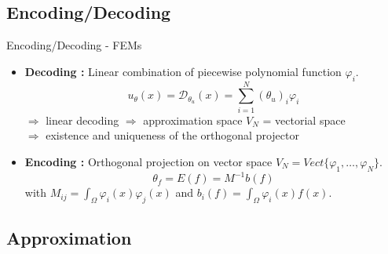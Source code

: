 \subsection{Encoding/Decoding}

\begin{frame}{Encoding/Decoding - FEMs}
	\begin{itemize}[\textbullet]
		\item \textbf{Decoding :} Linear combination of piecewise polynomial function $\varphi_i$.
		\begin{equation*}
			u_\theta(x)=\mathcal{D}_{\theta_u}(x) = \sum_{i=1}^{N}(\theta_u)_i\varphi_i
		\end{equation*}
		$\Rightarrow$ linear decoding $\Rightarrow$ approximation space $V_N$ = vectorial space \\
		$\Rightarrow$ existence and uniqueness of the orthogonal projector
		\item \textbf{Encoding :} Orthogonal projection on vector space $V_N=Vect\{\varphi_1,\dots,\varphi_N\}$.
		\begin{equation*}
			\theta_f=E(f)=M^{-1}b(f)
		\end{equation*}
		with $M_{ij}=\int_\Omega \varphi_i(x)\varphi_j(x)$ and $b_i(f)=\int_\Omega \varphi_i(x)f(x)$.  
	\end{itemize}
\end{frame}

\subsection{Approximation}

